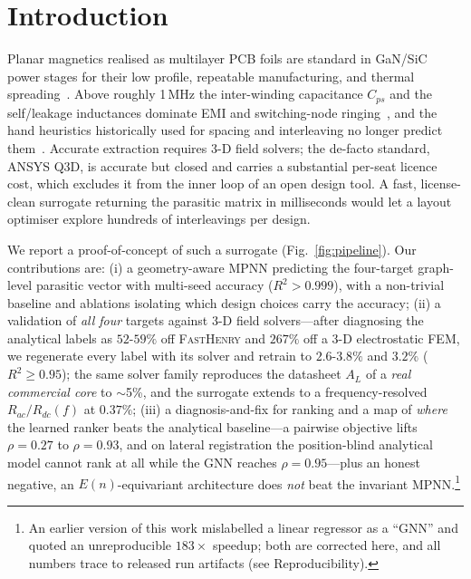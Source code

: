 \documentclass[letterpaper,twocolumn,9pt]{extarticle}
\begin{document}
\section{Introduction}
Planar magnetics realised as multilayer PCB foils are standard in GaN/SiC power
stages for their low profile, repeatable manufacturing, and thermal
spreading~\cite{ouyang,hurley}. Above roughly 1\,MHz the inter-winding
capacitance $C_{ps}$ and the self/leakage inductances dominate EMI and
switching-node ringing~\cite{ott,paul}, and the hand heuristics historically used
for spacing and interleaving no longer predict them~\cite{erickson}. Accurate
extraction requires 3-D field solvers; the de-facto standard, ANSYS Q3D, is
accurate but closed and carries a substantial per-seat licence cost, which
excludes it from the inner loop of an open design tool. A fast, license-clean
surrogate returning the parasitic matrix in milliseconds would let a layout
optimiser explore hundreds of interleavings per design.

We report a proof-of-concept of such a surrogate (Fig.~\ref{fig:pipeline}). Our
contributions are: (i) a geometry-aware MPNN predicting the four-target
graph-level parasitic vector with multi-seed accuracy ($R^2>0.999$), with a
non-trivial baseline and ablations isolating which design choices carry the
accuracy; (ii) a validation of \emph{all four} targets against 3-D field
solvers---after diagnosing the analytical labels as $52$-$59\%$ off
\textsc{FastHenry} and $267\%$ off a 3-D electrostatic FEM, we regenerate every
label with its solver and retrain to $2.6$-$3.8\%$ and $3.2\%$
($R^2\!\ge\!0.95$); the same solver family reproduces the datasheet $A_L$ of a
\emph{real commercial core} to $\sim$5\%, and the surrogate extends to a
frequency-resolved $R_{ac}/R_{dc}(f)$ at $0.37\%$; (iii) a diagnosis-and-fix for
ranking and a map of \emph{where} the learned ranker beats the analytical
baseline---a pairwise objective lifts $\rho=0.27$ to $\rho=0.93$, and on lateral
registration the position-blind analytical model cannot rank at all while the GNN
reaches $\rho=0.95$---plus an honest negative, an $E(n)$-equivariant architecture
does \emph{not} beat the invariant MPNN.\footnote{An earlier version of this work
mislabelled a linear regressor as a ``GNN'' and quoted an unreproducible
$183\times$ speedup; both are corrected here, and all numbers trace to released
run artifacts (see Reproducibility).}
\end{document}
